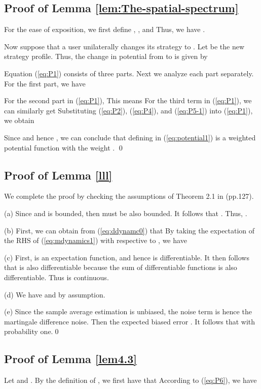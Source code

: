 \appendix\label{appendixA}
\subsection{Proof of Lemma \ref{lem:The-spatial-spectrum}}\label{proof1}
For the ease of exposition, we first define ,
, and
Thus, we have .

Now suppose that a user  unilaterally changes its strategy 
to . Let 
be the new strategy profile. Thus, the change in potential 
from  to  is given by


Equation (\ref{eq:P1}) consists of three parts. Next we analyze each part separately. For the first part, we have


For the second part in (\ref{eq:P1}), 
This means 
For the third term in (\ref{eq:P1}), we can similarly get
Substituting (\ref{eq:P2}), (\ref{eq:P4}), and (\ref{eq:P5-1}) into
(\ref{eq:P1}), we obtain

Since  and hence , we can conclude
that  defining in (\ref{eq:potential1}) is a weighted
potential function with the weight .
\qed

\subsection{Proof of Lemma \ref{lll}}\label{proof1-2}
We complete the proof by checking the assumptions of Theorem 2.1 in
\cite{key-8}(pp.127).

(a) Since  and  is bounded, then
 must be also bounded. It follows
that .
Thus, .

(b) First, we can obtain from (\ref{eq:ddynamc0}) that 
By taking the expectation of the RHS of (\ref{eq:mdynamics1}) with
respective to , we have


(c) First, 
is an expectation function, and hence is differentiable. It then follows
that 
is also differentiable because the sum of differentiable functions
is also differentiable. Thus 
is continuous.

(d) We have  and 
by assumption.

(e) Since the sample average estimation is unbiased, the noise term
is hence the martingale difference noise. Then the expected biased
error . It follows that 
with probability one.\qed


\subsection{Proof of Lemma \ref{lem4.3}}\label{proof1-4}
Let  and . By the definition of , we first have that
According to (\ref{eq:P6}), we have


